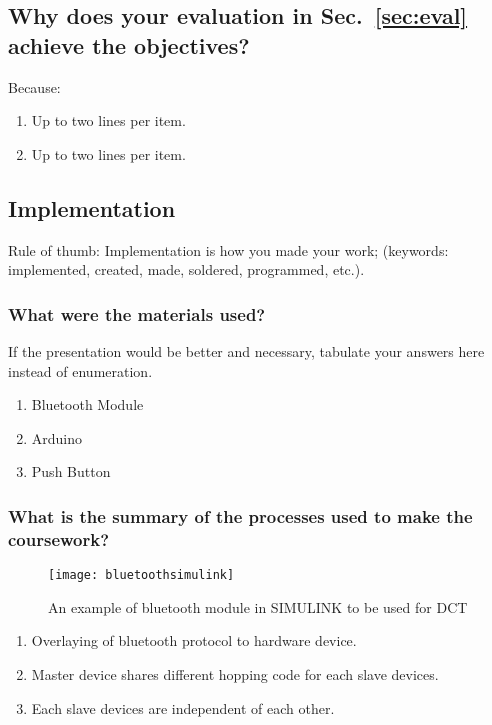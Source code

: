 \subsection{Why does your evaluation in Sec.~\ref{sec:eval}  achieve the objectives?}
Because:
\begin{enumerate}
	\item Up to two lines per item.
	\item Up to two lines per item.
\end{enumerate}



\subsection{Implementation}
\label{sec:implem}

Rule of thumb: Implementation is how you made your  work; (keywords: implemented, created, made, soldered, programmed, etc.).


\subsubsection{What were the materials used?}
If the presentation would be better and necessary, tabulate your answers here instead of enumeration.
\begin{enumerate}
	\item Bluetooth Module
	\item Arduino
	\item Push Button
\end{enumerate}


\subsubsection{What is the summary of the processes used to make the coursework?}

\begin{figure}[hp]
	\centering
	\captionsetup{justification=centering,margin=2cm}
	\texttt{[image: bluetoothsimulink]}
	\caption{An example of bluetooth module in SIMULINK to be used for DCT}
\end{figure}

\begin{enumerate}
	\item Overlaying of bluetooth protocol to hardware device.
	\item Master device shares different hopping code for each slave devices.
	\item Each slave devices are independent of each other.
\end{enumerate}


